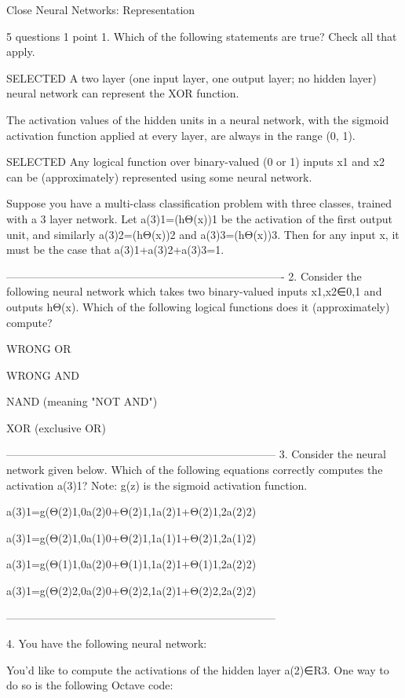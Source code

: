 Close
Neural Networks: Representation

5 questions
1
point
1. 
Which of the following statements are true? Check all that apply.

SELECTED A two layer (one input layer, one output layer; no hidden layer) neural network can represent the XOR function.

The activation values of the hidden units in a neural network, with the sigmoid activation function applied at every layer, are always in the range (0, 1).

SELECTED Any logical function over binary-valued (0 or 1) inputs x1 and x2 can be (approximately) represented using some neural network.

Suppose you have a multi-class classification problem with three classes, trained with a 3 layer network. Let a(3)1=(hΘ(x))1 be the activation of the first output unit, and similarly a(3)2=(hΘ(x))2 and a(3)3=(hΘ(x))3. Then for any input x, it must be the case that a(3)1+a(3)2+a(3)3=1.

----------------------------------------------------------------------------
2. 
Consider the following neural network which takes two binary-valued inputs x1,x2∈{0,1} and outputs hΘ(x). Which of the following logical functions does it (approximately) compute?



WRONG OR

WRONG AND

NAND (meaning "NOT AND")

XOR (exclusive OR)

--------------------------------------------------------------------------
3. 
Consider the neural network given below. Which of the following equations correctly computes the activation a(3)1? Note: g(z) is the sigmoid activation function.



a(3)1=g(Θ(2)1,0a(2)0+Θ(2)1,1a(2)1+Θ(2)1,2a(2)2)

a(3)1=g(Θ(2)1,0a(1)0+Θ(2)1,1a(1)1+Θ(2)1,2a(1)2)

a(3)1=g(Θ(1)1,0a(2)0+Θ(1)1,1a(2)1+Θ(1)1,2a(2)2)

a(3)1=g(Θ(2)2,0a(2)0+Θ(2)2,1a(2)1+Θ(2)2,2a(2)2)

--------------------------------------------------------------------------

4. 
You have the following neural network:


You'd like to compute the activations of the hidden layer a(2)∈R3. One way to do so is the following Octave code:


